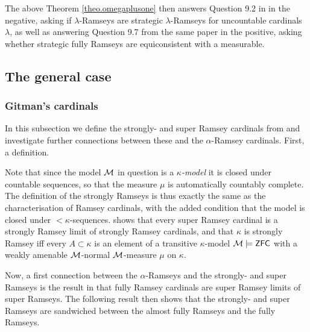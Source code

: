 \documentclass[../../main]{subfiles}
\begin{document}
The above Theorem \ref{theo.omegaplusone} then answers Question 9.2 in \cite{HolySchlicht} in the negative, asking if $\lambda$-Ramseys are strategic $\lambda$-Ramseys for uncountable cardinals $\lambda$, as well as answering Question 9.7 from the same paper in the positive, asking whether strategic fully Ramseys are equiconsistent with a measurable.


\subsection{The general case}

\subsubsection{Gitman's cardinals}

In this subsection we define the strongly- and super Ramsey cardinals from \cite{Ramsey1} and investigate further connections between these and the $\alpha$-Ramsey cardinals. First, a definition.


Note that since the model $\operatorname{\mathcal M}$ in question is a \textit{$\kappa$-model} it is closed under countable sequences, so that the measure $\mu$ is automatically countably complete. The definition of the strongly Ramseys is thus exactly the same as the characterisation of Ramsey cardinals, with the added condition that the model is closed under ${<}\kappa$-sequences. \cite{Ramsey1} shows that every super Ramsey cardinal is a strongly Ramsey limit of strongly Ramsey cardinals, and that $\kappa$ is strongly Ramsey iff every $A\subset\kappa$ is an element of a transitive $\kappa$-model $\operatorname{\mathcal M}\models\textsf{ZFC}$ with a weakly amenable $\operatorname{\mathcal M}$-normal $\operatorname{\mathcal M}$-measure $\mu$ on $\kappa$.

\qquad Now, a first connection between the $\alpha$-Ramseys and the strongly- and super Ramseys is the result in \cite{HolySchlicht} that fully Ramsey cardinals are super Ramsey limits of super Ramseys. The following result then shows that the strongly- and super Ramseys are sandwiched between the almost fully Ramseys and the fully Ramseys.
\end{document}
